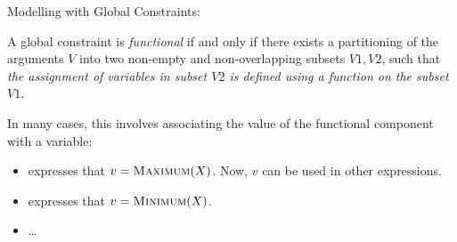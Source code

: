 \documentclass{cons-beamer}
\begin{document}
\begin{frame}{Modelling with Global Constraints:}
  \vfill

  \begin{definition}
    A global constraint  is \textit{functional} if and only if there exists a partitioning of the arguments $V$ into two non-empty and non-overlapping subsets $V1, V2$, such that \textit{the assignment of variables in subset $V2$ is defined using a function on the subset $V1$}.
  \end{definition}
  \vfill

  In many cases, this involves associating the value of the functional component with a variable:

  \begin{examples}
    \begin{itemize}
      \item {} expresses that $v = \textsc{Maximum}(X)$. Now, $v$ can be used in other expressions.
      \item {} expresses that $v = \textsc{Minimum}(X)$.
      \item \dots
    \end{itemize}
  \end{examples} 
\end{frame}
\end{document}
